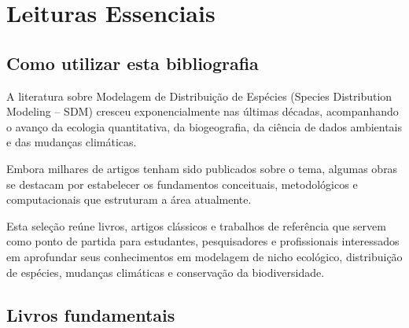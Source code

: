 \chapter*{Leituras Essenciais}

\section*{Como utilizar esta bibliografia}

A literatura sobre Modelagem de Distribuição de Espécies (Species Distribution
Modeling -- SDM) cresceu exponencialmente nas últimas décadas, acompanhando o
avanço da ecologia quantitativa, da biogeografia, da ciência de dados
ambientais e das mudanças climáticas.

Embora milhares de artigos tenham sido publicados sobre o tema, algumas obras
se destacam por estabelecer os fundamentos conceituais, metodológicos e
computacionais que estruturam a área atualmente.

Esta seleção reúne livros, artigos clássicos e trabalhos de referência que
servem como ponto de partida para estudantes, pesquisadores e profissionais
interessados em aprofundar seus conhecimentos em modelagem de nicho ecológico,
distribuição de espécies, mudanças climáticas e conservação da biodiversidade.

\section{Livros fundamentais}

